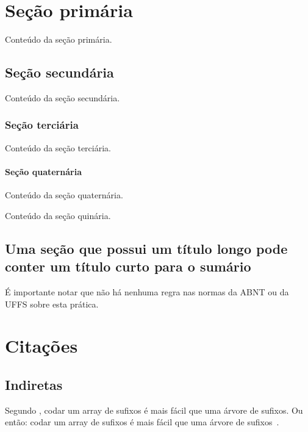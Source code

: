 \documentclass[serif, brazilian]{uffstex}
\begin{document}
\tableofcontents*
\cleardoublepage%

\textual%

\chapter{Seção primária}

Conteúdo da seção primária.

\section{Seção secundária}

Conteúdo da seção secundária.

\subsection{Seção terciária}

Conteúdo da seção terciária.

\subsubsection{Seção quaternária}

Conteúdo da seção quaternária.


Conteúdo da seção quinária.

\section[Título curto]{Uma seção que possui um título longo
pode conter um título curto para o sumário}

É importante notar que não há nenhuma regra nas normas da ABNT ou da UFFS
sobre esta prática.

\chapter{Citações}

\section{Indiretas}

Segundo \textcite{halim3rd}, codar um array de sufixos é mais fácil que uma árvore de sufixos. Ou então: codar um array de sufixos é mais fácil que uma árvore de sufixos~\cite[253]{halim3rd}.
\end{document}
